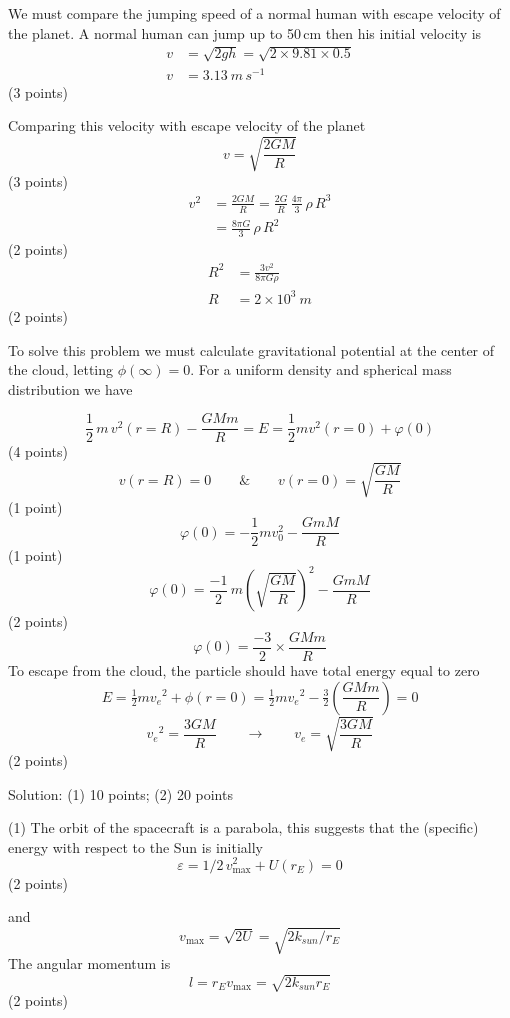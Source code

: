 We must compare the jumping speed of a normal human with escape velocity of
the planet. A normal human can jump up to 50\,cm then his initial velocity is
\begin{align*}
  v &= \sqrt{2gh} = \sqrt{2\times 9.81\times 0.5} \\
  v &= 3.13\ m\,s^{-1}
\end{align*}
\hfill(3 points)

Comparing this velocity with escape velocity of the planet
\[
  v = \sqrt{\frac{2GM}{R}}
\]
\hfill(3 points)
\begin{align*}
  v^2 &= \frac{2GM}{R} = \frac{2G}{R}\,\frac{4\pi}{3}\,\rho\,R^3 \\
      &= \frac{8\pi G}{3}\,\rho\,R^2
\end{align*}
\hfill(2 points)
\begin{align*}
  R^2 &= \frac{3v^2}{8\pi G\rho} \\
  R &= 2\times 10^{3}\ m
\end{align*}
\hfill(2 points)

To solve this problem we must calculate gravitational potential at the center
of the cloud, letting $\phi(\infty) = 0$. For a uniform density and spherical
mass distribution we have

\[
  \frac{1}{2}\,m\,v^2(r=R) - \frac{GMm}{R} = E
  = \frac{1}{2}mv^2(r=0) + \varphi(0)
\]
\hfill(4 points)
\[
  v(r=R) = 0 \qquad \& \qquad v(r=0) = \sqrt{\frac{GM}{R}}
\]
\hfill(1 point)
\[
  \varphi(0) = -\frac{1}{2}mv_0^2 - \frac{GmM}{R}
\]
\hfill(1 point)
\[
  \varphi(0) = \frac{-1}{2}\,m\left(\sqrt{\frac{GM}{R}}\right)^2
             - \frac{GmM}{R}
\]
\hfill(2 points)
\[
  \varphi(0) = \frac{-3}{2}\times\frac{GMm}{R}
\]
To escape from the cloud, the particle should have total energy equal to zero
\[
  E = \tfrac{1}{2}m{v_e}^2 + \phi(r=0)
    = \tfrac{1}{2}m{v_e}^2 - \tfrac{3}{2}\left(\frac{GMm}{R}\right) = 0
\]
\[
  {v_e}^2 = \frac{3GM}{R}
  \qquad\rightarrow\qquad
  v_e = \sqrt{\frac{3GM}{R}}
\]
\hfill(2 points)

Solution: (1) 10 points; (2) 20 points

(1) The orbit of the spacecraft is a parabola, this suggests that the
(specific) energy with respect to the Sun is initially
\[
  \varepsilon = 1/2\,v_{\max}^2 + U(r_E) = 0
\]
\hfill(2 points)

and
\[
  v_{\max} = \sqrt{2U} = \sqrt{2k_{sun}/r_E}
\]
The angular momentum is
\[
  l = r_E v_{\max} = \sqrt{2k_{sun}r_E}
\]
\hfill(2 points)

